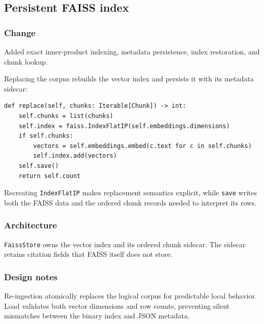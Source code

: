 
\subsection{Persistent FAISS index}


\subsubsection{Change}

Added exact inner-product indexing, metadata persistence, index restoration, and chunk lookup.

Replacing the corpus rebuilds the vector index and persists it with its metadata sidecar:

\begin{verbatim}
def replace(self, chunks: Iterable[Chunk]) -> int:
    self.chunks = list(chunks)
    self.index = faiss.IndexFlatIP(self.embeddings.dimensions)
    if self.chunks:
        vectors = self.embeddings.embed(c.text for c in self.chunks)
        self.index.add(vectors)
    self.save()
    return self.count
\end{verbatim}

Recreating \texttt{IndexFlatIP} makes replacement semantics explicit, while \texttt{save} writes both the FAISS data and the ordered chunk records needed to interpret its rows.

\subsubsection{Architecture}

\texttt{FaissStore} owns the vector index and its ordered chunk sidecar. The sidecar retains citation fields that FAISS itself does not store.

\subsubsection{Design notes}

Re-ingestion atomically replaces the logical corpus for predictable local behavior. Load validates both vector dimensions and row counts, preventing silent mismatches between the binary index and JSON metadata.

